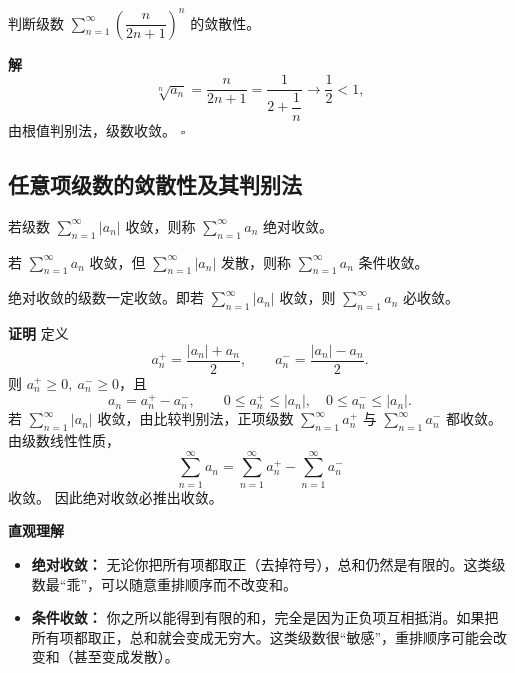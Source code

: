 \documentclass[fontset=fandol]{ctexart}
\newenvironment{custom}[1]{\par\noindent\textbf{#1}\quad}{\par\vspace{0.8em}}
\newenvironment{solution}{\par\noindent\textbf{解}\quad}{\hfill$\square$\par\vspace{0.8em}}
\newenvironment{intuition}{\par\noindent\textbf{直观理解}\quad}{\par\vspace{0.8em}}
\begin{document}
\begin{example}
判断级数 \(\sum\limits_{n = 1}^{  \infty } \left(\dfrac{n}{2n+1}\right)^n\) 的敛散性。
\end{example}
\begin{solution}
\[
\sqrt[n]{a_n} = \dfrac{n}{2n+1} = \dfrac{1}{2 + \dfrac{1}{n}} \to \dfrac{1}{2} < 1,
\]
由根值判别法，级数收敛。
\end{solution}

\subsection{任意项级数的敛散性及其判别法}

\begin{definition}[绝对收敛]
	若级数 \(\sum\limits_{n = 1}^{  \infty } |a_n|\) 收敛，则称 \(\sum\limits_{n = 1}^{  \infty } a_n\) 绝对收敛。
\end{definition}

\begin{definition}[条件收敛]
	若 \(\sum\limits_{n = 1}^{  \infty } a_n\) 收敛，但 \(\sum\limits_{n = 1}^{  \infty } |a_n|\) 发散，则称 \(\sum\limits_{n = 1}^{  \infty } a_n\) 条件收敛。
\end{definition}

\begin{theorem}[绝对收敛与收敛的关系]
	绝对收敛的级数一定收敛。即若 \(\sum\limits_{n = 1}^{  \infty } |a_n|\) 收敛，则 \(\sum\limits_{n = 1}^{  \infty } a_n\) 必收敛。
\end{theorem}

\begin{custom}{证明}
	定义
	\[
	a_n^+=\frac{|a_n|+a_n}{2},\qquad a_n^-=\frac{|a_n|-a_n}{2}.
	\]
	则 $a_n^+\ge0,\ a_n^-\ge0$，且
	\[
	a_n=a_n^+-a_n^-,\qquad 0\le a_n^+\le |a_n|,\quad 0\le a_n^-\le |a_n|.
	\]
	若 $\sum\limits_{n = 1}^{  \infty } |a_n|$ 收敛，由比较判别法，正项级数 $\sum\limits_{n = 1}^{  \infty } a_n^+$ 与 $\sum\limits_{n = 1}^{  \infty } a_n^-$ 都收敛。 由级数线性性质，
	\[
	\sum_{n=1}^{\infty} a_n=\sum_{n=1}^{\infty} a_n^+-\sum_{n=1}^{\infty} a_n^-
	\]
	收敛。 因此绝对收敛必推出收敛。
\end{custom}

\begin{intuition}
	\begin{itemize}
		\item \textbf{绝对收敛：} 无论你把所有项都取正（去掉符号），总和仍然是有限的。这类级数最“乖”，可以随意重排顺序而不改变和。
		\item \textbf{条件收敛：} 你之所以能得到有限的和，完全是因为正负项互相抵消。如果把所有项都取正，总和就会变成无穷大。这类级数很“敏感”，重排顺序可能会改变和（甚至变成发散）。
	\end{itemize}
\end{intuition}
\end{document}
